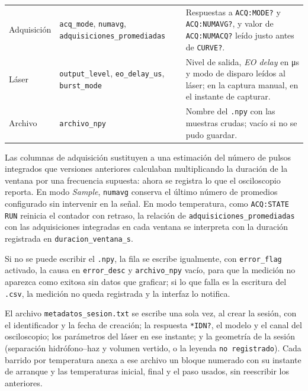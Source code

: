 \begin{table}[H]
\begin{tabularx}{\textwidth}{@{}>{\raggedright\arraybackslash}p{2.1cm}%
      >{\raggedright\arraybackslash}p{4.6cm}%
      >{\raggedright\arraybackslash}X@{}}
    \addlinespace
    Adquisición &
      \texttt{acq\_mode}, \texttt{numavg},
      \texttt{adquisiciones\_promediadas} &
      Respuestas a \texttt{ACQ:MODE?} y \texttt{ACQ:NUMAVG?}, y valor
      de \texttt{ACQ:NUMACQ?} leído justo antes de \texttt{CURVE?}. \\
    \addlinespace
    Láser &
      \texttt{output\_level}, \texttt{eo\_delay\_us},
      \texttt{burst\_mode} &
      Nivel de salida, \textit{EO delay} en \si{\micro\second} y modo
      de disparo leídos al láser; en la captura manual, en el instante
      de capturar. \\
    \addlinespace
    Archivo &
      \texttt{archivo\_npy} &
      Nombre del \texttt{.npy} con las muestras crudas; vacío si no se
      pudo guardar. \\
    \bottomrule
  \end{tabularx}
\end{table}

Las columnas de adquisición sustituyen a una estimación del número de
pulsos integrados que versiones anteriores calculaban multiplicando la
duración de la ventana por una frecuencia supuesta: ahora se registra lo
que el osciloscopio reporta. En modo \textit{Sample}, \texttt{numavg}
conserva el último número de promedios configurado sin intervenir en la
señal. En modo temperatura, como \texttt{ACQ:STATE RUN} reinicia el
contador con retraso, la relación de \texttt{adquisiciones\_promediadas}
con las adquisiciones integradas en cada ventana se interpreta con la
duración registrada en \texttt{duracion\_ventana\_s}.

Si no se puede escribir el \texttt{.npy}, la fila se escribe igualmente,
con \texttt{error\_flag} activado, la causa en \texttt{error\_desc} y
\texttt{archivo\_npy} vacío, para que la medición no aparezca como
exitosa sin datos que graficar; si lo que falla es la escritura del
\texttt{.csv}, la medición no queda registrada y la interfaz lo
notifica.

El archivo \texttt{metadatos\_sesion.txt} se escribe una sola vez, al
crear la sesión, con el identificador y la fecha de creación; la
respuesta \texttt{*IDN?}, el modelo y el canal del osciloscopio; los
parámetros del láser en ese instante; y la geometría de la sesión
(separación hidrófono--haz y volumen vertido, o la leyenda \texttt{no
registrado}). Cada barrido por temperatura anexa a ese archivo un bloque
numerado con su instante de arranque y las temperaturas inicial, final y
el paso usados, sin reescribir los anteriores.

